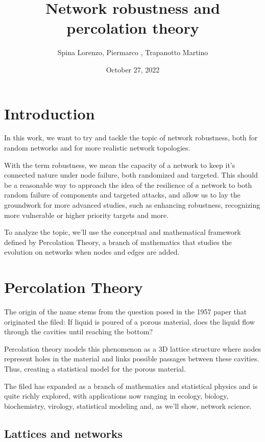 \documentclass[
]{article}
\title{Network robustness and percolation theory}
\author{Spina Lorenzo, Piermarco , Trapanotto Martino}
\date{October 27, 2022}
\begin{document}
\maketitle

\hypertarget{introduction}{%
\section{Introduction}\label{introduction}}

In this work, we want to try and tackle the topic of network robustness,
both for random networks and for more realistic network topologies.

With the term robustness, we mean the capacity of a network to keep it's
connected nature under node failure, both randomized and targeted. This
should be a reasonable way to approach the idea of the resilience of a
network to both random failure of components and targeted attacks, and
allow us to lay the groundwork for more advanced studies, such as
enhancing robustness, recognizing more vulnerable or higher priority
targets and more.

To analyze the topic, we'll use the conceptual and mathematical
framework defined by Percolation Theory, a branch of mathematics that
studies the evolution on networks when nodes and edges are added.

\hypertarget{percolation-theory}{%
\section{Percolation Theory}\label{percolation-theory}}

The origin of the name stems from the question posed in the 1957 paper
that originated the filed: If liquid is poured of a porous material,
does the liquid flow through the cavities until reaching the bottom?

Percolation theory models this phenomenon as a 3D lattice structure
where nodes represent holes in the material and links possible passages
between these cavities. Thus, creating a statistical model for the
porous material.

The filed has expanded as a branch of mathematics and statistical
physics and is quite richly explored, with applications now ranging in
ecology, biology, biochemistry, virology, statistical modeling and, as
we'll show, network science.

\hypertarget{lattices-and-networks}{%
\subsection{Lattices and networks}\label{lattices-and-networks}}
\end{document}
